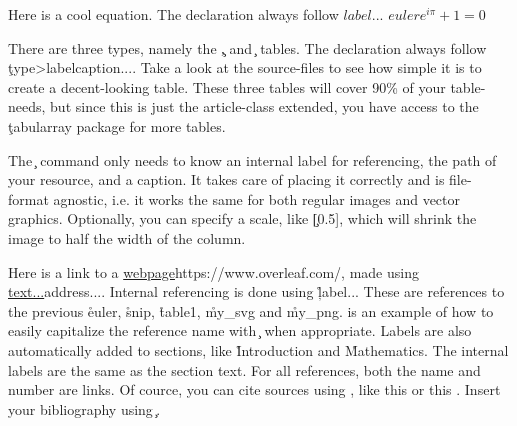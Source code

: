\documentclass[onecolumn]{tome}
\begin{document}
Here is a cool equation. The declaration always follow \c{\begin{math}{label} ... \end{math}}
\begin{math}{euler}
    e^{i\pi}+1=0
\end{math}

There are three types, namely the \c{\cols, \rows} and \c{\grid} tables. The declaration always follow \c{\<type>{label}{caption}{...}}. Take a look at the source-files to see how simple it is to create a decent-looking table. These three tables will cover 90\% of your table-needs, but since this is just the article-class extended, you have access to the \c{tabularray}\cite{tabularray} package for more tables.




The \c{} command only needs to know an internal label for referencing, the path of your resource, and a caption. It takes care of placing it correctly and is file-format agnostic, i.e. it works the same for both regular images and vector graphics. Optionally, you can specify a scale, like \c{[0.5]}, which will shrink the image to half the width of the column.



Here is a link to a \url{webpage}{https://www.overleaf.com/}, made using \c{\url{text...}{address...}}. Internal referencing is done using \c{\r{label...}} These are references to the previous \r{euler}, \r{snip}, \r{table1}, \r{my_svg} and \r{my_png}.  is an example of how to easily capitalize the reference name with \c{} when appropriate. Labels are also automatically added to sections, like \r{Introduction} and \r{Mathematics}. The internal labels are the same as the section text. For all references, both the name and number are links. Of cource, you can cite sources using \c{\cite{...}}, like this \cite{minted} or this \cite{tabularray}. Insert your bibliography using \c{}.
\end{document}
